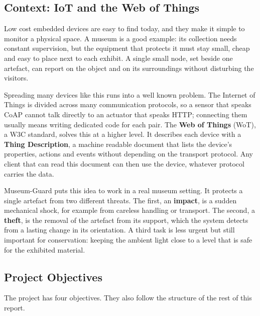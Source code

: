 \documentclass[conference]{IEEEtran}
\begin{document}
\subsection{Context: IoT and the Web of Things}
Low cost embedded devices are easy to find today, and they make it simple to monitor a physical space. A museum is a good example: its collection needs constant supervision, but the equipment that protects it must stay small, cheap and easy to place next to each exhibit. A single small node, set beside one artefact, can report on the object and on its surroundings without disturbing the visitors.

Spreading many devices like this runs into a well known problem. The Internet of Things is divided across many communication protocols, so a sensor that speaks CoAP cannot talk directly to an actuator that speaks HTTP; connecting them usually means writing dedicated code for each pair. The \textbf{Web of Things} (WoT), a W3C standard, solves this at a higher level. It describes each device with a \textbf{Thing Description}, a machine readable document that lists the device's properties, actions and events without depending on the transport protocol. Any client that can read this document can then use the device, whatever protocol carries the data.

Museum-Guard puts this idea to work in a real museum setting. It protects a single artefact from two different threats. The first, an \textbf{impact}, is a sudden mechanical shock, for example from careless handling or transport. The second, a \textbf{theft}, is the removal of the artefact from its support, which the system detects from a lasting change in its orientation. A third task is less urgent but still important for conservation: keeping the ambient light close to a level that is safe for the exhibited material.

\subsection{Project Objectives}
The project has four objectives. They also follow the structure of the rest of this report.
\end{document}
